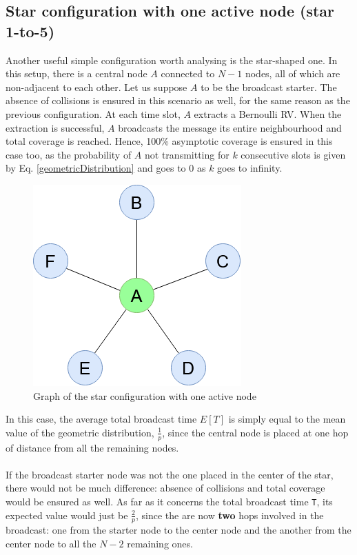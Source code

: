 \subsection{Star configuration with one active node (star 1-to-5)}
\label{ssec:star1}
Another useful simple configuration worth analysing is the star-shaped one. In
this setup, there is a central node $A$ connected to $N - 1$ nodes, all of which
are non-adjacent to each other. Let us suppose $A$ to be the broadcast starter.
The absence of collisions is ensured in this scenario as well, for the
same reason as the previous configuration.
At each time slot, $A$ extracts a Bernoulli RV. When the extraction is
successful, $A$ broadcasts the message its entire neighbourhood and total
coverage is reached. Hence, 100\% asymptotic coverage is ensured in this case
too, as the probability of $A$ not transmitting for $k$ consecutive slots is
given by Eq. \ref{geometricDistribution} and goes to $0$ as $k$ goes to
infinity.
\begin{figure}[H]
    \begin{center}
        \includegraphics[scale=0.4]{img/star_graph.png}
        \caption{Graph of the star configuration with one active node}
        \label{fig:star1to5}
    \end{center}
\end{figure}
\noindent
In this case, the average total broadcast time $E[T]$ is simply equal to the
mean value of the geometric distribution, $\frac{1}{p}$, since the central
node is placed at one hop of distance from all the remaining nodes.\\
\\
If the broadcast starter node was not the one placed in the center of the star,
there would not be much difference: absence of collisions and total coverage
would be ensured as well. As far as it concerns the total broadcast time
\texttt{T}, its expected value would just be $\frac{2}{p}$, since
the are now \textbf{two} hops involved in the broadcast: one from the starter
node to the center node and the another from the center node to all the $N - 2$
remaining ones.

